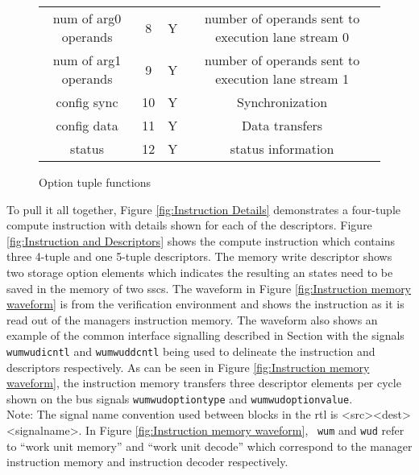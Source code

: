 \begin{figure}[!t]
\begin{minipage}{1\textwidth}
\begin{minipage}{0.85\textwidth}
\begin{adjustbox}{width=1\textwidth}
\begin{tabular}{ |c|c|c|c|  }
              num of arg0 operands             &    8   &  Y&  number of operands sent to execution lane stream 0\\
              num of arg1 operands             &    9   &  Y&  number of operands sent to execution lane stream 1\\
              config sync                      &   10   &  Y&  Synchronization \\
              config data                      &   11   &  Y&  Data transfers\\
              status                           &   12   &  Y&  status information \\
              \hline
            \end{tabular}
        \end{adjustbox}
        \caption{Option tuple functions}
        \label{tab:Option tuple functions}
    \end{minipage}
  \end{minipage}
\end{figure}


To pull it all together, Figure \ref{fig:Instruction Details} demonstrates a four-tuple compute instruction with details shown for each of the descriptors.
Figure \ref{fig:Instruction and Descriptors} shows the compute instruction which contains three 4-tuple and one 5-tuple descriptors.
The memory write descriptor shows two storage option elements which indicates the resulting \ac{an} states need to be saved in the memory of two \acp{ssc}.
The waveform in Figure \ref{fig:Instruction memory waveform} is from the verification environment and shows the instruction as it is read out of the managers instruction memory.
The waveform also shows an example of the common interface signalling described in Section \label{sec:Common Bus Signalling} with the signals \texttt{wum\textunderscore\textunderscore wud\textunderscore\textunderscore icntl} and \texttt{wum\textunderscore\textunderscore wud\textunderscore\textunderscore dcntl} being used to delineate the instruction and descriptors respectively.
As can be seen in Figure \ref{fig:Instruction memory waveform}, the instruction memory transfers three descriptor elements per cycle shown on the bus signals \texttt{wum\textunderscore\textunderscore wud\textunderscore\textunderscore option\textunderscore type} and \texttt{wum\textunderscore\textunderscore wud\textunderscore\textunderscore option\textunderscore value}.
\\
Note: The signal name convention used between blocks in the \ac{rtl} is <src>\textunderscore\textunderscore <dest>\textunderscore\textunderscore <signal\textunderscore\textunderscore  name>. In Figure \ref{fig:Instruction memory waveform},~ \texttt{wum} and \texttt{wud} refer to ``work unit memory'' and ``work unit decode''
which correspond to the manager instruction memory and instruction decoder respectively.

